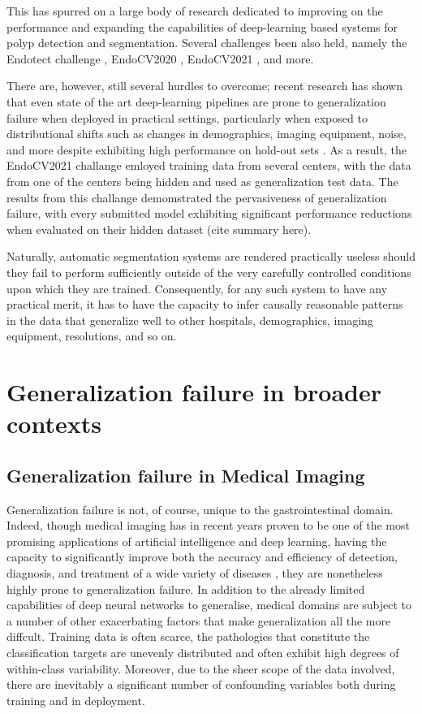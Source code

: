 	This has spurred on a large body of research dedicated to improving on the performance and expanding the capabilities of deep-learning based systems for polyp detection and segmentation. Several challenges been also held, namely the Endotect challenge \cite{endotect}, EndoCV2020 \cite{endocv2020}, EndoCV2021 \cite{endocv2021}, and more.
	
	There are, however, still several hurdles to overcome; recent research has shown that even state of the art deep-learning pipelines are prone to generalization failure when deployed in practical settings, particularly when exposed to distributional shifts such as changes in demographics, imaging equipment, noise, and more despite exhibiting high performance on hold-out sets \cite{retinopathy, damour2020underspecification, pneumonia, shortcut_learning}. As a result, the EndoCV2021 challange emloyed training data from several centers, with the data from one of the centers being hidden and used as generalization test data. The results from this challange demomstrated the pervasiveness of generalization failure, with every submitted model exhibiting significant performance reductions when evaluated on their hidden dataset (cite summary here). 
	
	Naturally, automatic segmentation systems are rendered practically useless should they fail to perform sufficiently outside of the very carefully controlled conditions upon which they are trained. Consequently, for any such system to have any practical merit, it has to have the capacity to infer causally reasonable patterns in the data that generalize well to other hospitals, demographics, imaging equipment, resolutions, and so on. 

\section{Generalization failure in broader contexts} \label{case_studies}
	\subsection{Generalization failure in Medical Imaging}
	Generalization failure is not, of course, unique to the gastrointestinal domain. Indeed, though medical imaging has in recent years proven to be one of the most promising applications of artificial intelligence and deep learning, having the capacity to significantly improve both the accuracy and efficiency of detection, diagnosis, and treatment of a wide variety of diseases \cite{dl_medical_imaging}, they are nonetheless highly prone to generalization failure. In addition to the already limited capabilities of deep neural networks to generalise, medical domains are subject to a number of other exacerbating factors that make generalization all the more diffcult. Training data is often scarce, the pathologies that constitute the classification targets are unevenly distributed and often exhibit high degrees of within-class variability. Moreover, due to the sheer scope of the data involved, there are inevitably a significant number of confounding variables both during training and in deployment.  
		

